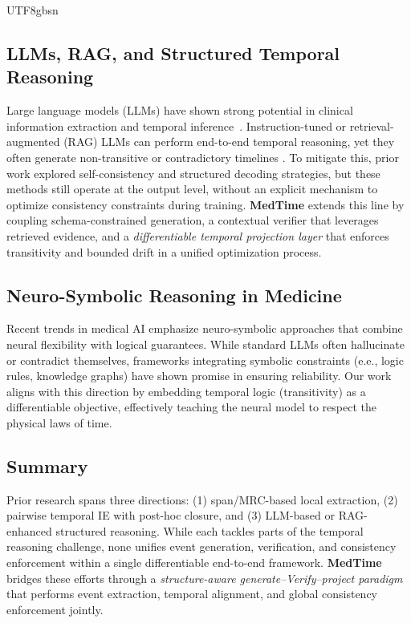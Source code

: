 \documentclass[11pt]{article}
\begin{document}
\begin{CJK*}{UTF8}{gbsn}
\subsection{LLMs, RAG, and Structured Temporal Reasoning}
Large language models (LLMs) have shown strong potential in clinical information extraction and temporal inference~\cite{li2024gptmed,wang2024medtemporal,lopez2025clear,fan2025consistent,eirew2025beyondpairwise}. Instruction-tuned or retrieval-augmented (RAG) LLMs can perform end-to-end temporal reasoning, yet they often generate non-transitive or contradictory timelines \cite{lu2023structureddecoding,welleck2024consistency,zhao2025temporaleval,kumar2025temporalbench,gong2025eventrelbench}. To mitigate this, prior work explored self-consistency and structured decoding strategies, but these methods still operate at the output level, without an explicit mechanism to optimize consistency constraints during training. \textbf{MedTime} extends this line by coupling schema-constrained generation, a contextual verifier that leverages retrieved evidence, and a \emph{differentiable temporal projection layer} that enforces transitivity and bounded drift in a unified optimization process.

\subsection{Neuro-Symbolic Reasoning in Medicine}
Recent trends in medical AI emphasize neuro-symbolic approaches that combine neural flexibility with logical guarantees. While standard LLMs often hallucinate or contradict themselves, frameworks integrating symbolic constraints (e.e., logic rules, knowledge graphs) have shown promise in ensuring reliability. Our work aligns with this direction by embedding temporal logic (transitivity) as a differentiable objective, effectively teaching the neural model to respect the physical laws of time.

\subsection{Summary}
Prior research spans three directions: (1) span/MRC-based local extraction, (2) pairwise temporal IE with post-hoc closure, and (3) LLM-based or RAG-enhanced structured reasoning. While each tackles parts of the temporal reasoning challenge, none unifies event generation, verification, and consistency enforcement within a single differentiable end-to-end framework. \textbf{MedTime} bridges these efforts through a \emph{structure-aware generate–Verify–project paradigm} that performs event extraction, temporal alignment, and global consistency enforcement jointly.


\end{CJK*}
\end{document}
